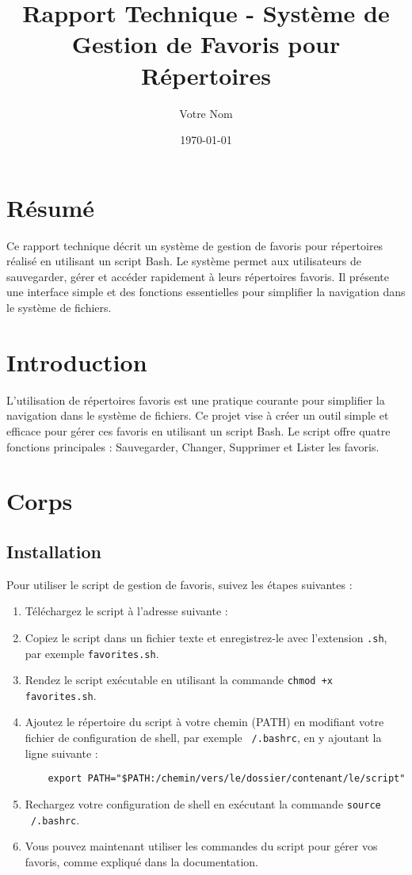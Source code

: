 \documentclass[a4paper, 12pt]{article}
\title{Rapport Technique - Système de Gestion de Favoris pour Répertoires}
\author{Votre Nom}
\date{\today}
\begin{document}
\maketitle

\section{Résumé}
Ce rapport technique décrit un système de gestion de favoris pour répertoires réalisé en utilisant un script Bash. Le système permet aux utilisateurs de sauvegarder, gérer et accéder rapidement à leurs répertoires favoris. Il présente une interface simple et des fonctions essentielles pour simplifier la navigation dans le système de fichiers.

\section{Introduction}
L'utilisation de répertoires favoris est une pratique courante pour simplifier la navigation dans le système de fichiers. Ce projet vise à créer un outil simple et efficace pour gérer ces favoris en utilisant un script Bash. Le script offre quatre fonctions principales : Sauvegarder, Changer, Supprimer et Lister les favoris.

\section{Corps}
\subsection{Installation}

Pour utiliser le script de gestion de favoris, suivez les étapes suivantes :

\begin{enumerate}
    \item Téléchargez le script à l'adresse suivante : 
    \item Copiez le script dans un fichier texte et enregistrez-le avec l'extension \texttt{.sh}, par exemple \texttt{favorites.sh}.

    \item Rendez le script exécutable en utilisant la commande \texttt{chmod +x favorites.sh}.

    \item Ajoutez le répertoire du script à votre chemin (PATH) en modifiant votre fichier de configuration de shell, par exemple \texttt{~/.bashrc}, en y ajoutant la ligne suivante :

    \begin{verbatim}
    export PATH="$PATH:/chemin/vers/le/dossier/contenant/le/script"
    \end{verbatim}

    \item Rechargez votre configuration de shell en exécutant la commande \texttt{source ~/.bashrc}.

    \item Vous pouvez maintenant utiliser les commandes du script pour gérer vos favoris, comme expliqué dans la documentation.

\end{enumerate}
\end{document}
